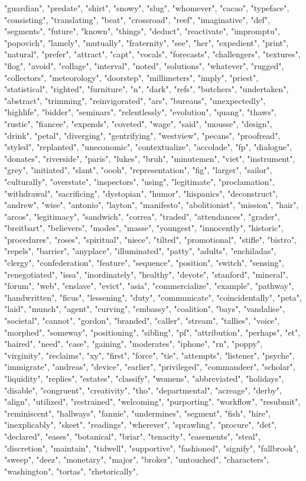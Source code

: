 "guardian", "predate", "shirt", "snowy", "slug", "whomever", "cacao", "typeface", "consisting", "translating", "beat", "crossroad", "reef", "imaginative", "def", "segments", "future", "known", "things", "deduct", "reactivate", "impromptu", "popovich", "lamely", "mutually", "fraternity", "see", "her", "expedient", "print", "natural", "prefer", "attract", "capt", "vocals", "forecasts", "challengers", "textures", "flog", "avoid", "collage", "interval", "noted", "solutions", "whatever", "rugged", "collectors", "meteorology", "doorstep", "millimeters", "imply", "priest", "statistical", "righted", "furniture", "n", "dark", "refs", "butchers", "undertaken", "abstract", "trimming", "reinvigorated", "ars", "bureaus", "unexpectedly", "highlife", "bidder", "seminars", "relentlessly", "evolution", "quang", "thaws", "rustic", "fiancee", "expends", "coveted", "wage", "said", "mousse", "design", "drink", "petal", "diverging", "gentrifying", "westview", "pecans", "proofread", "styled", "replanted", "uneconomic", "contextualize", "accolade", "fp", "dialogue", "donates", "riverside", "paris", "lukes", "bruh", "minutemen", "viet", "instrument", "grey", "initiated", "slant", "oooh", "representation", "fig", "larger", "sailor", "culturally", "overstate", "inspectors", "using", "legitimate", "proclamation", "withdrawal", "sacrificing", "dystopian", "humor", "hispanics", "deconstruct", "andrew", "wise", "antonio", "layton", "manifesto", "abolitionist", "mission", "hair", "arcos", "legitimacy", "sandwich", "correa", "traded", "attendances", "grader", "breitbart", "believers", "modes", "masse", "youngest", "innocently", "historic", "procedures", "roses", "spiritual", "niece", "tilted", "promotional", "stifle", "bistro", "repels", "barrier", "anyplace", "illuminated", "patty", "adults", "enchiladas", "clergy", "confederation", "feature", "sequence", "position", "switch", "sensing", "renegotiated", "issa", "inordinately", "healthy", "devote", "stanford", "mineral", "forum", "web", "enslave", "evict", "asia", "commercialize", "example", "pathway", "handwritten", "ficus", "lessening", "duty", "communicate", "coincidentally", "peta", "laid", "munch", "agent", "curving", "embassy", "coalition", "bays", "vandalise", "societal", "cannot", "gordon", "branded", "caller", "stream", "tallies", "voice", "morphed", "someway", "positioning", "sibling", "pf", "attribution", "perhaps", "et", "haired", "need", "case", "gaining", "moderates", "iphone", "rn", "poppy", "virginity", "reclaims", "xy", "first", "force", "tie", "attempts", "listener", "psyche", "immigrate", "andreas", "device", "earlier", "privileged", "commandeer", "scholar", "liquidity", "replies", "estates", "classify", "womens", "abbreviated", "holidays", "disable", "congruent", "creativity", "tho", "departmental", "acreage", "derby", "align", "utilized", "restrained", "welcoming", "purporting", "workflow", "resubmit", "reminiscent", "hallways", "fannie", "undermines", "segment", "fish", "hire", "inexplicably", "skeet", "readings", "wherever", "sprawling", "procure", "det", "declared", "eases", "botanical", "briar", "tenacity", "easements", "steal", "discretion", "maintain", "tidwell", "supportive", "fashioned", "signify", "fallbrook", "sweep", "deez", "monetary", "major", "broker", "untouched", "characters", "washington", "tortas", "rhetorically", 